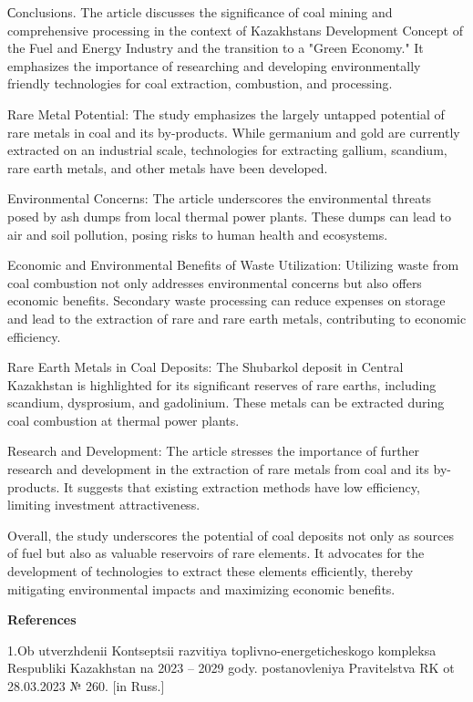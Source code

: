 Сonclusions. The article discusses the significance of coal mining and
comprehensive processing in the context of Kazakhstan\textquotesingle s
Development Concept of the Fuel and Energy Industry and the transition
to a "Green Economy." It emphasizes the importance of researching and
developing environmentally friendly technologies for coal extraction,
combustion, and processing.

Rare Metal Potential: The study emphasizes the largely untapped
potential of rare metals in coal and its by-products. While germanium
and gold are currently extracted on an industrial scale, technologies
for extracting gallium, scandium, rare earth metals, and other metals
have been developed.

Environmental Concerns: The article underscores the environmental
threats posed by ash dumps from local thermal power plants. These dumps
can lead to air and soil pollution, posing risks to human health and
ecosystems.

Economic and Environmental Benefits of Waste Utilization: Utilizing
waste from coal combustion not only addresses environmental concerns but
also offers economic benefits. Secondary waste processing can reduce
expenses on storage and lead to the extraction of rare and rare earth
metals, contributing to economic efficiency.

Rare Earth Metals in Coal Deposits: The Shubarkol deposit in Central
Kazakhstan is highlighted for its significant reserves of rare earths,
including scandium, dysprosium, and gadolinium. These metals can be
extracted during coal combustion at thermal power plants.

Research and Development: The article stresses the importance of further
research and development in the extraction of rare metals from coal and
its by-products. It suggests that existing extraction methods have low
efficiency, limiting investment attractiveness.

Overall, the study underscores the potential of coal deposits not only
as sources of fuel but also as valuable reservoirs of rare elements. It
advocates for the development of technologies to extract these elements
efficiently, thereby mitigating environmental impacts and maximizing
economic benefits.

\textbf{References}

1.Ob utverzhdenii Kontseptsii razvitiya toplivno-energeticheskogo
kompleksa Respubliki Kazakhstan na 2023 -- 2029 gody. postanovleniya
Pravitel\textquotesingle stva RK ot 28.03.2023 № 260. {[}in Russ.{]}

